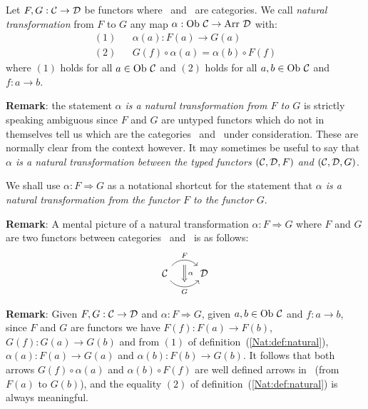\begin{defin}\label{Nat:def:natural}
    Let $F,G:\mbox{$\cal C$}\to\mbox{$\cal D$}$ be functors where \Cat\ and \Dat\ are categories.
    We call {\em natural transformation} from $F$ to $G$ any map 
    $\alpha : \ob\ \Cat\to\arr\ \Dat$ with:
        \begin{eqnarray*}
            (1)& &\alpha(a) : F(a) \to G(a)\\
            (2)& &G(f)\circ\alpha(a) = \alpha(b) \circ F(f)
        \end{eqnarray*}
    where $(1)$ holds for all $a\in\mbox{\rm Ob}\ \mbox{$\cal C$}$ and $(2)$ holds for all 
    $a,b\in\mbox{\rm Ob}\ \mbox{$\cal C$}$ and $f:a\to b$.
\end{defin}

\noindent
{\bf Remark}: the statement {\em $\alpha$ is a natural transformation
from $F$ to $G$} is strictly speaking ambiguous since $F$ and $G$ are
untyped functors which do not in themselves tell us which are the categories
\Cat\ and \Dat\ under consideration. These are normally clear from the context
however. It may sometimes be useful to say that {\em $\alpha$ is a natural 
transformation between the typed functors $(\mbox{$\cal C$},\mbox{$\cal D$},F)$ and $(\mbox{$\cal C$},\mbox{$\cal D$},G)$}.

\begin{notation}\label{Nat:notation:natural:arrow}
    We shall use $\alpha:F\Rightarrow G$ as a notational shortcut for the
    statement that {\em $\alpha$ is a natural transformation from the
    functor $F$ to the functor $G$}.
\end{notation}

\noindent
{\bf Remark}: A mental picture of a natural transformation $\alpha:F\Rightarrow 
G$ where $F$ and $G$ are two functors between categories \Cat\ and \Dat\ is as 
follows:
    \[
        \begin{tikzcd}
            \Cat \arrow[r, "F", bend left  = 50, ""{name=U, below}]
                 \arrow[r, swap, "G", bend right = 50, ""{name=D, above}]
              & \Dat
            \arrow[Rightarrow, "\,\alpha", from = U, to = D]
        \end{tikzcd}
    \]

\noindent
{\bf Remark}: Given $F,G:\mbox{$\cal C$}\to\mbox{$\cal D$}$ and $\alpha:F\Rightarrow G$, given
$a,b\in\mbox{\rm Ob}\ \mbox{$\cal C$}$ and $f:a \to b$, since $F$ and $G$ are functors we have 
$F(f):F(a) \to F(b)$, $G(f):G(a)\to G(b)$ and from $(1)$ of 
definition~(\ref{Nat:def:natural}), $\alpha(a):F(a)\to G(a)$ and 
$\alpha(b):F(b)\to G(b)$. It follows that both arrows $G(f)\circ\alpha(a)$ 
and $\alpha(b)\circ F(f)$ are well defined arrows in \Dat\ (from $F(a)$ to 
$G(b)$), and the equality $(2)$ of definition~(\ref{Nat:def:natural}) is 
always meaningful.

